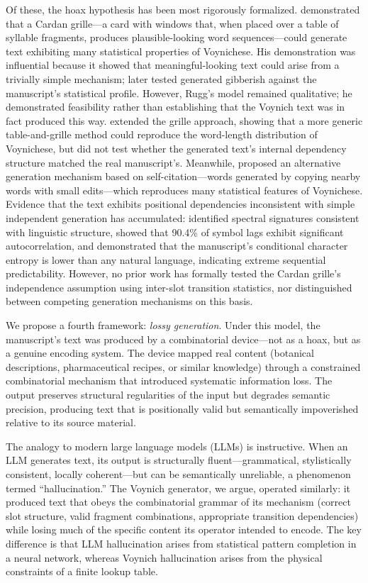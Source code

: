 \documentclass[12pt]{article}
\begin{document}
Of these, the hoax hypothesis has been most rigorously formalized. \citet{Rugg2004} demonstrated that a Cardan grille---a card with windows that, when placed over a table of syllable fragments, produces plausible-looking word sequences---could generate text exhibiting many statistical properties of Voynichese. His demonstration was influential because it showed that meaningful-looking text could arise from a trivially simple mechanism; \citet{Gaskell2022} later tested generated gibberish against the manuscript's statistical profile. However, Rugg's model remained qualitative; he demonstrated feasibility rather than establishing that the Voynich text was in fact produced this way. \citet{Zandbergen2021} extended the grille approach, showing that a more generic table-and-grille method could reproduce the word-length distribution of Voynichese, but did not test whether the generated text's internal dependency structure matched the real manuscript's. Meanwhile, \citet{Timm2020} proposed an alternative generation mechanism based on self-citation---words generated by copying nearby words with small edits---which reproduces many statistical features of Voynichese. Evidence that the text exhibits positional dependencies inconsistent with simple independent generation has accumulated: \citet{Landini2001} identified spectral signatures consistent with linguistic structure, \citet{Frodi2020} showed that 90.4\% of symbol lags exhibit significant autocorrelation, and \citet{Lindemann2020} demonstrated that the manuscript's conditional character entropy is lower than any natural language, indicating extreme sequential predictability. However, no prior work has formally tested the Cardan grille's independence assumption using inter-slot transition statistics, nor distinguished between competing generation mechanisms on this basis.

We propose a fourth framework: \emph{lossy generation}. Under this model, the manuscript's text was produced by a combinatorial device---not as a hoax, but as a genuine encoding system. The device mapped real content (botanical descriptions, pharmaceutical recipes, or similar knowledge) through a constrained combinatorial mechanism that introduced systematic information loss. The output preserves structural regularities of the input but degrades semantic precision, producing text that is positionally valid but semantically impoverished relative to its source material.

The analogy to modern large language models (LLMs) is instructive. When an LLM generates text, its output is structurally fluent---grammatical, stylistically consistent, locally coherent---but can be semantically unreliable, a phenomenon termed ``hallucination.'' The Voynich generator, we argue, operated similarly: it produced text that obeys the combinatorial grammar of its mechanism (correct slot structure, valid fragment combinations, appropriate transition dependencies) while losing much of the specific content its operator intended to encode. The key difference is that LLM hallucination arises from statistical pattern completion in a neural network, whereas Voynich hallucination arises from the physical constraints of a finite lookup table.
\end{document}
